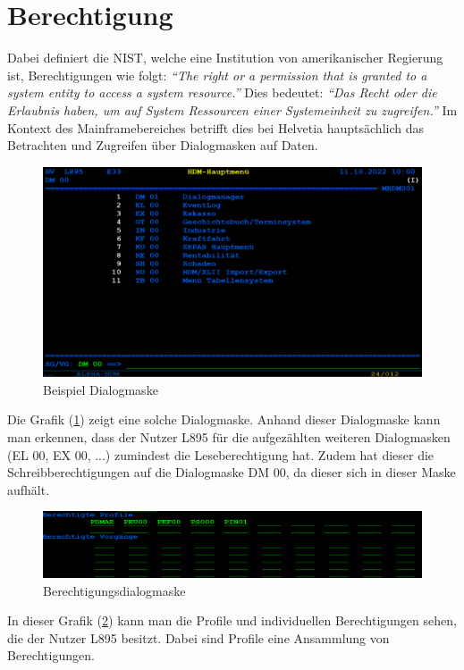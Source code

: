 \section{Berechtigung}
\label{sec:Berechtigung}
Dabei definiert die \ac{NIST}, welche eine Institution von amerikanischer Regierung ist, Berechtigungen wie folgt:
\newline
\newline
\textit{"`The right or a permission that is granted to a system entity to access a system resource."'} \cite{Auth}
\newline
\newline
Dies bedeutet:
\newline
\newline
\textit{"`Das Recht oder die Erlaubnis haben, um auf System Ressourcen einer Systemeinheit zu zugreifen."'} \cite{Mainframe}
\newline
\newline
Im Kontext des Mainframebereiches betrifft dies bei Helvetia hauptsächlich das Betrachten und Zugreifen über Dialogmasken auf Daten.
\begin{figure}[h!]
 \centering
 \includegraphics[width=1\textwidth]{gfx/Picture/Dialog.PNG}
 \caption{Beispiel Dialogmaske}
 \label{fig:Dial}
\end{figure}
Die Grafik (\ref{fig:Dial}) zeigt eine solche Dialogmaske.
Anhand dieser Dialogmaske kann man erkennen, dass der Nutzer L895 für die aufgezählten weiteren Dialogmasken (EL 00, EX 00, ...) zumindest die Leseberechtigung hat.
Zudem hat dieser die Schreibberechtigungen auf die Dialogmaske DM 00, da dieser sich in dieser Maske aufhält. 
\newline
\newline
\begin{figure}[h!]
 \centering
 \includegraphics[width=1\textwidth]{gfx/Picture/Berechtigung.PNG}
 \caption{Berechtigungsdialogmaske}
 \label{fig:Berch}
\end{figure}
In dieser Grafik (\ref{fig:Berch}) kann man die Profile und individuellen Berechtigungen sehen, die der Nutzer L895 besitzt.
Dabei sind Profile eine Ansammlung von Berechtigungen.

